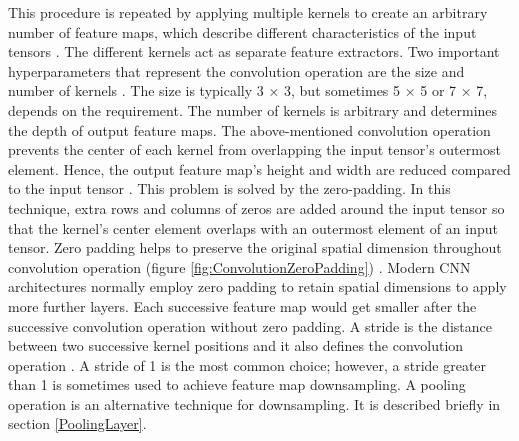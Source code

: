 This procedure is repeated by applying multiple kernels to create an arbitrary number of feature maps, which describe different characteristics of the input tensors \cite{articleCNNs}. The different kernels act as separate feature extractors. Two important hyperparameters that represent the convolution operation are the size and number of kernels \cite{articleCNNs}. The size is typically 3 × 3, but sometimes 5 × 5 or 7 × 7, depends on the requirement. The number of kernels is arbitrary and determines the depth of output feature maps. The above-mentioned convolution operation prevents the center of each kernel from overlapping the input tensor's outermost element. Hence, the output feature map's height and width are reduced compared to the input tensor \cite{articleCNNs}. This problem is solved by the zero-padding. In this technique, extra rows and columns of zeros are added around the input tensor so that the kernel's center element overlaps with an outermost element of an input tensor. Zero padding helps to preserve the original spatial dimension throughout convolution operation (figure \ref{fig:ConvolutionZeroPadding}) \cite{articleCNNs}. Modern \ac{CNN} architectures normally employ zero padding to retain spatial dimensions to apply more further layers. Each successive feature map would get smaller after the successive convolution operation without zero padding. A stride is the distance between two successive kernel positions and it also defines the convolution operation \cite{articleCNNs}. A stride of 1 is the most common choice; however, a stride greater than 1 is sometimes used to achieve feature map downsampling. A pooling operation is an alternative technique for downsampling. It is described briefly in section \ref{PoolingLayer}.

